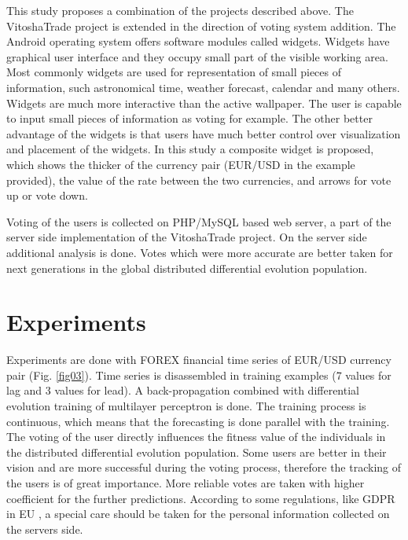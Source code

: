 \documentclass[11pt]{article}
\begin{document}
This study proposes a combination of the projects described above. The VitoshaTrade project is extended in the direction of voting system addition. The Android operating system offers software modules called widgets. Widgets have graphical user interface and they occupy small part of the visible working area. Most commonly widgets are used for representation of small pieces of information, such astronomical time, weather forecast, calendar and many others. Widgets are much more interactive than the active wallpaper. The user is capable to input small pieces of information as voting for example. The other better advantage of the widgets is that users have much better control over visualization and placement of the widgets. In this study a composite widget is proposed, which shows the thicker of the currency pair (EUR/USD in the example provided), the value of the rate between the two currencies, and arrows for vote up or vote down. 

Voting of the users is collected on PHP/MySQL based web server\cite{tomov01}, a part of the server side implementation of the VitoshaTrade project. On the server side additional analysis is done. Votes which were more accurate are better taken for next generations in the global distributed differential evolution population. 

\section{Experiments} \label{Experiments}

Experiments are done with FOREX financial time series of EUR/USD currency pair (Fig. \ref{fig03}). Time series is disassembled in training examples (7 values for lag and 3 values for lead). A back-propagation combined with differential evolution training of multilayer perceptron is done. The training process is continuous, which means that the forecasting is done parallel with the training. The voting of the user directly influences the fitness value of the individuals in the distributed differential evolution population. Some users are better in their vision and are more successful during the voting process, therefore the tracking of the users is of great importance. More reliable votes are taken with higher coefficient for the further predictions. According to some regulations, like GDPR in EU \cite{hristov01}, a special care should be taken for the personal information collected on the servers side. 
\end{document}
